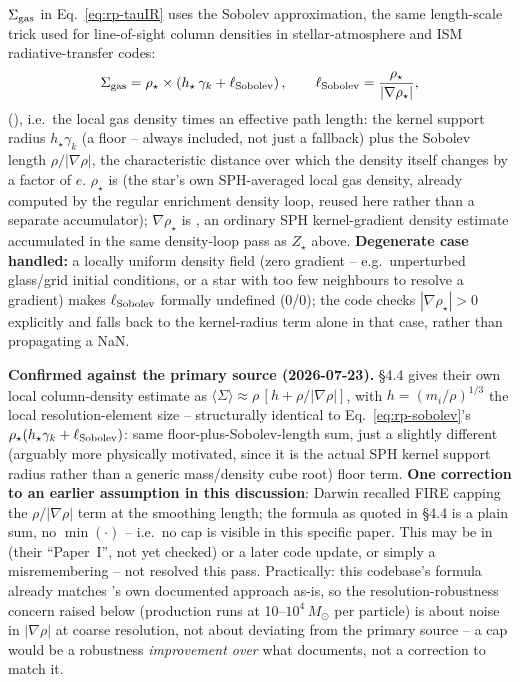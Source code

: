 $\Sigma_{\rm gas}$ in Eq.~\ref{eq:rp-tauIR} uses the Sobolev
approximation, the same length-scale trick used for line-of-sight
column densities in stellar-atmosphere and ISM radiative-transfer
codes:
\begin{equation}
  \Sigma_{\rm gas} = \rho_\star \times
  \left(h_\star\,\gamma_k + \ell_{\rm Sobolev}\right), \qquad
  \ell_{\rm Sobolev} = \frac{\rho_\star}{|\nabla\rho_\star|},
  \label{eq:rp-sobolev}
\end{equation}
(), i.e.\
the local gas density times an effective path length: the kernel
support radius $h_\star\gamma_k$ (a floor -- always included, not just
a fallback) plus the Sobolev length $\rho/|\nabla\rho|$, the
characteristic distance over which the density itself changes by a
factor of $e$. $\rho_\star$ is \code{enrichment\_weight} (the star's
own SPH-averaged local gas density, already computed by the regular
enrichment density loop, reused here rather than a separate
accumulator); $\nabla\rho_\star$ is
, an ordinary SPH kernel-gradient
density estimate accumulated in the same density-loop pass as $Z_\star$
above. \textbf{Degenerate case handled:} a locally uniform density
field (zero gradient -- e.g.\ unperturbed glass/grid initial
conditions, or a star with too few neighbours to resolve a gradient)
makes $\ell_{\rm Sobolev}$ formally undefined (0/0); the code checks
$|\nabla\rho_\star|>0$ explicitly and falls back to the kernel-radius
term alone in that case, rather than propagating a NaN.

\textbf{Confirmed against the primary source (2026-07-23).}
\citet{Hopkins2020} \S4.4 gives their own local column-density
estimate as $\langle\Sigma\rangle \approx \rho\,[h + \rho/|\nabla\rho|]$,
with $h=(m_i/\rho)^{1/3}$ the local resolution-element size --
structurally identical to Eq.~\ref{eq:rp-sobolev}'s
$\rho_\star(h_\star\gamma_k + \ell_{\rm Sobolev})$: same
floor-plus-Sobolev-length sum, just a slightly different (arguably
more physically motivated, since it is the actual SPH kernel support
radius rather than a generic mass/density cube root) floor term.
\textbf{One correction to an earlier assumption in this discussion}:
Darwin recalled FIRE capping the $\rho/|\nabla\rho|$ term at the
smoothing length; the formula as quoted in \citet{Hopkins2020} \S4.4
is a plain sum, no $\min(\cdot)$ -- i.e.\ no cap is visible in this
specific paper. This may be in \citet{Hopkins2018} (their ``Paper~I'',
not yet checked) or a later code update, or simply a misremembering --
not resolved this pass. Practically: this codebase's formula already
matches \citet{Hopkins2020}'s own documented approach as-is, so the
resolution-robustness concern raised below (production runs at
10--$10^4\,M_\odot$ per particle) is about noise in $|\nabla\rho|$
at coarse resolution, not about deviating from the primary source --
a cap would be a robustness \emph{improvement over} what
\citet{Hopkins2020} documents, not a correction to match it.

